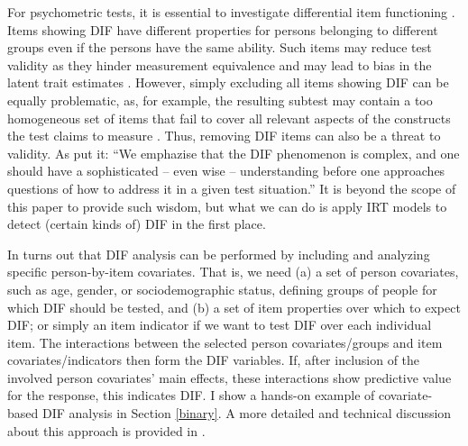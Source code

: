 \documentclass[
]{jss}
\begin{document}
For psychometric tests, it is essential to investigate differential item
functioning \citep[DIF;][]{holland1993, osterlind2009}. Items showing
DIF have different properties for persons belonging to different groups
even if the persons have the same ability. Such items may reduce test
validity as they hinder measurement equivalence and may lead to bias in
the latent trait estimates \citep[e.g.,][]{millsap1993, holland1993}.
However, simply excluding all items showing DIF can be equally
problematic, as, for example, the resulting subtest may contain a too
homogeneous set of items that fail to cover all relevant aspects of the
constructs the test claims to measure \citep[e.g.,][]{osterlind2009}.
Thus, removing DIF items can also be a threat to validity. As
\citet{osterlind2009} put it: ``We emphazise that the DIF phenomenon is
complex, and one should have a sophisticated -- even wise --
understanding before one approaches questions of how to address it in a
given test situation.'' It is beyond the scope of this paper to provide
such wisdom, but what we can do is apply IRT models to detect (certain
kinds of) DIF in the first place.

In turns out that DIF analysis can be performed by including and
analyzing specific person-by-item covariates. That is, we need (a) a set
of person covariates, such as age, gender, or sociodemographic status,
defining groups of people for which DIF should be tested, and (b) a set
of item properties over which to expect DIF; or simply an item indicator
if we want to test DIF over each individual item. The interactions
between the selected person covariates/groups and item
covariates/indicators then form the DIF variables. If, after inclusion
of the involved person covariates' main effects, these interactions show
predictive value for the response, this indicates DIF. I show a hands-on
example of covariate-based DIF analysis in Section \ref{binary}. A more
detailed and technical discussion about this approach is provided in
\citet{deboeck2011}.
\end{document}
